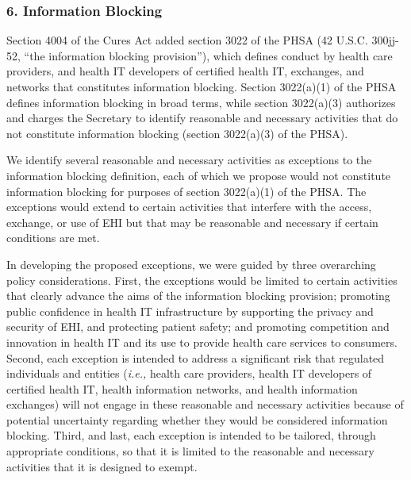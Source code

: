 \documentclass[twoside,11pt]{article}
\begin{document}
          \subsubsection{6. Information Blocking}

          Section 4004 of the Cures Act added section 3022 of the PHSA (42 U.S.C. 300jj-52, “the information blocking provision”), which defines conduct by health care providers, and health IT developers of certified health IT, exchanges, and networks that constitutes information blocking. Section 3022(a)(1) of the PHSA defines information blocking in broad terms, while section 3022(a)(3) authorizes and charges the Secretary to identify reasonable and necessary activities that do not constitute information blocking (section 3022(a)(3) of the PHSA).


          We identify several reasonable and necessary activities as exceptions to the information blocking definition, each of which we propose would not constitute information blocking for purposes of section 3022(a)(1) of the PHSA. The exceptions would extend to certain activities that interfere with the access, exchange, or use of EHI but that may be reasonable and necessary if certain conditions are met.



          In developing the proposed exceptions, we were guided by three overarching policy considerations. First, the exceptions would be limited to certain activities that clearly advance the aims of the information blocking provision; promoting public confidence in health IT infrastructure by supporting the privacy and security of EHI, and protecting patient safety; and promoting competition and innovation in health IT and its use to provide health care services to consumers. Second, each exception is intended to address a significant risk that regulated individuals and entities (\emph{i.e.,} health care providers, health IT developers of certified health IT, health information networks, and health information exchanges) will not engage in these reasonable and necessary activities because of potential uncertainty regarding whether they would be considered information blocking. Third, and last, each exception is intended to be tailored, through appropriate conditions, so that it is limited to the reasonable and necessary activities that it is designed to exempt.
\end{document}
